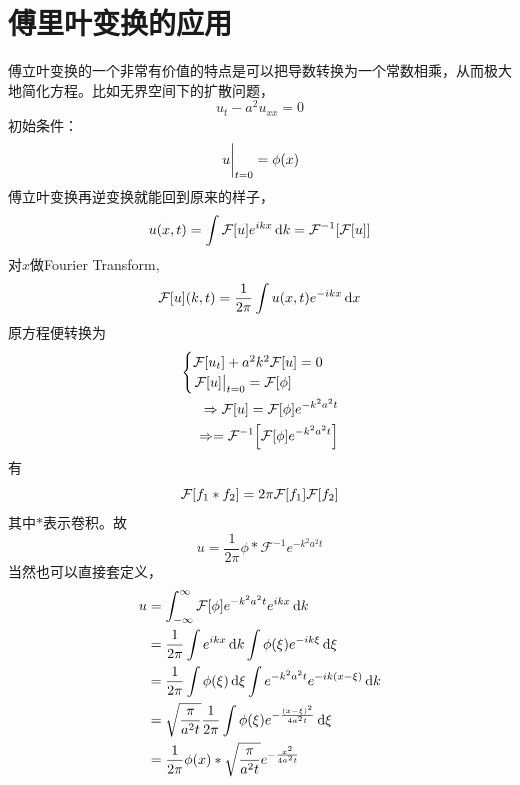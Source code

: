 \documentclass[12pt,a4paper,openany,twoside]{book}
\numberwithin{equation}{section}
\begin{document}
      \section{傅里叶变换的应用}
        傅立叶变换的一个非常有价值的特点是可以把导数转换为一个常数相乘，从而极大地简化方程。比如无界空间下的扩散问题，
        \begin{equation*}
          u_t-a^2u_{xx} = 0
        \end{equation*} 
        初始条件：
        \begin{equation*}
          \eval{u}_{t=0}=\phi\qty(x)
        \end{equation*} 
        傅立叶变换再逆变换就能回到原来的样子，
        \begin{equation*}
          u\qty(x,t)=\int{\mathcal{F}\qty[u]e^{ikx}\dd{k}}=\mathcal{F}^{-1}\qty[\mathcal{F}\qty[u]]
        \end{equation*} 
        对$x$做Fourier Transform,
        \begin{equation*}
          \mathcal{F}\qty[u]\qty(k,t)=\frac{1}{2\pi}\int{u\qty(x,t)e^{-ikx}\dd{x}} 
        \end{equation*} 
        原方程便转换为
        \begin{eqnarray*}
          \begin{cases}
            \mathcal{F}\qty[u_t]+a^2k^2\mathcal{F}\qty[u]=0\\
            \eval{\mathcal{F}\qty[u]}_{t=0}=\mathcal{F}\qty[\phi]
          \end{cases}\\
          \Rightarrow\mathcal{F}\qty[u]=\mathcal{F}\qty[\phi]e^{-k^2a^2t}\\
          \Rightarrow=\mathcal{F}^{-1}\qty[\mathcal{F}\qty[\phi]e^{-k^2a^2t}]
        \end{eqnarray*}
        有
        \begin{equation*}
          \mathcal{F}\qty[f_1 * f_2]=2\pi\mathcal{F}\qty[f_1]\mathcal{F}\qty[f_2]
        \end{equation*}
        其中$*$表示卷积。故
        \begin{equation*}
          u=\frac{1}{2\pi}\phi*\mathcal{F}^{-1}e^{-k^2a^2t} 
        \end{equation*} 
        当然也可以直接套定义，
        \begin{align*}
          u&=\int_{-\infty}^\infty{\mathcal{F}\qty[\phi]e^{-k^2a^2t}e^{ikx}\dd{k}}\\
          &=\frac{1}{2\pi}\int{e^{ikx}\dd{k}\int{\phi\qty(\xi)e^{-ik\xi}\dd{\xi}}}\\
          &=\frac{1}{2\pi}\int{\phi\qty(\xi)\dd{\xi}\int{e^{-k^2a^2t}e^{-ik\qty(x-\xi)}\dd{k}}}\\
          &=\sqrt{\frac{\pi}{a^2 t}}\frac{1}{2\pi}\int{\phi\qty(\xi)e^{-\frac{\qty(x-\xi)^2}{4a^2t}}\dd{\xi}}\\
          &=\frac{1}{2\pi}\phi(x)*\sqrt{\frac{\pi}{a^2t}}e^{-\frac{x^2}{4a^2t}}
        \end{align*}
\end{document}
